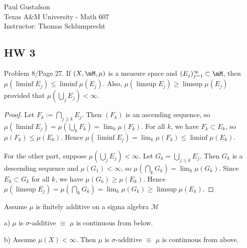 \documentclass{article}
\begin{document}
\noindent Paul Gustafson\\
\noindent Texas A\&M University - Math 607\\ 
\noindent Instructor: Thomas Schlumprecht

\subsection*{HW 3}

 Problem 8/Page 27. If $(X, \mM, \mu)$ is a measure space and $(E_j)_{j=1}^\infty \subset \mM$, then $\mu(\liminf E_j) \le \liminf \mu(E_j)$. Also, $\mu(\limsup E_j) \ge \limsup \mu(E_j)$ provided that $\mu(\bigcup_j E_j) < \infty$.

\begin{proof}
Let $F_k := \bigcap_{j \ge k} E_j$. Then $(F_k)$ is an ascending sequence, so $\mu(\liminf E_j) = \mu(\bigcup_k F_k) = \lim_k \mu(F_k)$. For all $k$, we have $F_k \subset E_k$, so $\mu(F_k) \le \mu(E_k)$. Hence $\mu(\liminf E_j) = \lim_k \mu(F_k) \le \liminf \mu(E_k)$.

For the other part, suppose $\mu(\bigcup_j E_j) < \infty$. Let $G_k = \bigcup_{j \ge k} E_j$. Then $G_k$ is a descending sequence and $\mu(G_1) < \infty$, so $\mu( \bigcap_k G_k) = \lim_k \mu(G_k)$. Since $E_k \subset G_k$ for all $k$, we have $\mu(G_k) \ge \mu(E_k)$.  Hence $\mu(\limsup E_j) = \mu(\bigcap_k G_k) = \lim_k \mu(G_k) \ge \limsup \mu(E_k)$.

\end{proof}

 Assume $\mu$ is finitely additive on a sigma algebra $\mathcal M$

a) $\mu$ is $\sigma$-additive $\equiv$ $\mu$ is continuous from below.

b) Assume $\mu(X) < \infty$. Then $\mu$ is $\sigma$-additive $\equiv$ $\mu$ is continuous from above.
\end{document}
